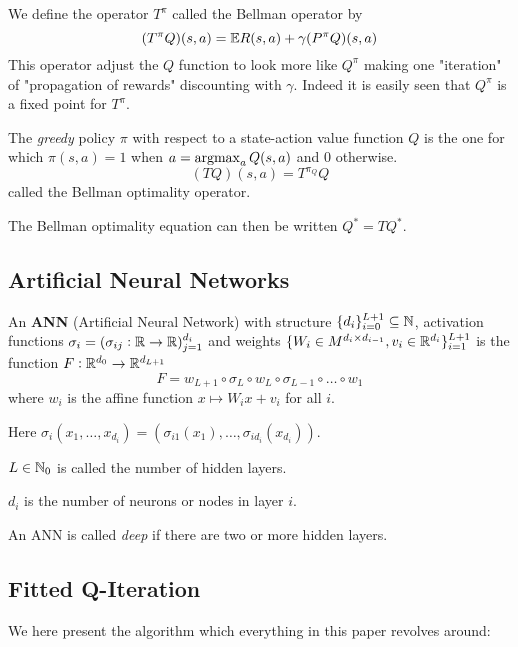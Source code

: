 We define the operator $T^\pi$ called the Bellman operator by
\[ (T^\pi Q)(s, a) = \mathbb{E} R(s, a) + \gamma (P^\pi Q)(s, a) \]
This operator adjust the $Q$ function to look more like $Q^\pi$ making one
"iteration" of "propagation of rewards" discounting with $\gamma$.
Indeed it is easily seen that $Q^\pi$ is a fixed point for $T^\pi$.

The \emph{greedy} policy $\pi$ with respect to a state-action value function
$Q$ is the one for which $\pi(s,a) = 1$ when $a = \operatorname*{argmax}_a Q(s,a)$
and 0 otherwise.
\[ (T Q)(s, a) = T^{\pi_Q} Q \]
called the Bellman optimality operator.

The Bellman optimality equation can then be written $Q^* = TQ^*$.

\subsection{Artificial Neural Networks}

\begin{defn}\label{def_ANN}
	An \textbf{ANN} (Artificial Neural Network) with structure
	$\{ d_i \}_{i=0}^{L+1} \subseteq \mathbb{N}$,
	activation functions $\sigma_i = (\sigma_{ij} : \mathbb{R} \to \mathbb{R})_{j=1}^{d_i}$
	and weights $\{ W_i \in M^{d_i \times d_{i-1}}, v_i \in \mathbb{R}^{d_i} \}_{i=1}^{L+1}$
	is the function $F:\mathbb{R}^{d_0} \to \mathbb{R}^{d_{L+1}}$ 
	\[ F = w_{L+1} \circ \sigma_L \circ w_L \circ \sigma_{L-1} \circ \dots \circ w_1 \]
	where $w_i$ is the affine function $x \mapsto W_i x + v_i$ for all $i$.

	Here $\sigma_i(x_1, \dots, x_{d_i})
	= (\sigma_{i1}(x_1), \dots, \sigma_{id_{i}}(x_{d_{i}}))$.

	$L \in \mathbb{N}_0$ is called the number of hidden layers.

	$d_i$ is the number of neurons or nodes in layer $i$.
\end{defn}

An ANN is called \emph{deep} if there are two or more hidden layers.

\subsection{Fitted Q-Iteration}

We here present the algorithm which everything in this paper revolves around:

